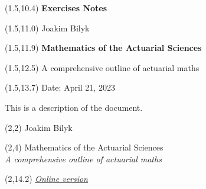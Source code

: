 \documentclass[a4paper,12pt,openany]{book}
\begin{document}
\thispagestyle{empty}

\begin{textblock}{12}(1.5,10.4) \noindent\fontsize{20}{20}\selectfont \textbf{Exercises Notes}
\end{textblock}

\begin{textblock}{12}(1.5,11.0) \noindent\fontsize{14}{14}\selectfont Joakim Bilyk
\end{textblock}

\begin{textblock}{12}(1.5,11.9)
\noindent\fontsize{20}{20}\selectfont \textbf{Mathematics of the Actuarial Sciences}
\end{textblock}

\begin{textblock}{12}(1.5,12.5)
    \noindent\fontsize{14}{14}\selectfont A comprehensive outline of actuarial maths
\end{textblock}

\begin{textblock}{12}(1.5,13.7)
\noindent\fontsize{11}{11}\selectfont Date: April 21, 2023
\end{textblock}

\hspace{1pt}
\newpage

\onehalfspacing
\thispagestyle{empty}
\noindent

This is a description of the document.

\newpage

\thispagestyle{empty}

\begin{textblock}{12}(2,2)
\noindent\fontsize{20}{20}\selectfont Joakim Bilyk
\end{textblock}

\begin{textblock}{12}(2,4)
\noindent\fontsize{35pt}{40pt}\selectfont Mathematics of the Actuarial Sciences\\
\fontsize{20pt}{40pt}\selectfont \emph{A comprehensive outline of actuarial maths}
\end{textblock}

\begin{textblock}{12}(2,14.2)
\noindent\fontsize{16}{11}\selectfont \emph{\href{https://joakim-bilyk.github.io/books/exercises}{Online version}}
\end{textblock}

\hspace{1pt}
\newpage
\end{document}
